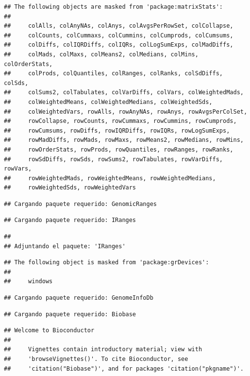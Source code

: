 \documentclass[
]{article}
\begin{document}
\begin{verbatim}
## The following objects are masked from 'package:matrixStats':
## 
##     colAlls, colAnyNAs, colAnys, colAvgsPerRowSet, colCollapse,
##     colCounts, colCummaxs, colCummins, colCumprods, colCumsums,
##     colDiffs, colIQRDiffs, colIQRs, colLogSumExps, colMadDiffs,
##     colMads, colMaxs, colMeans2, colMedians, colMins, colOrderStats,
##     colProds, colQuantiles, colRanges, colRanks, colSdDiffs, colSds,
##     colSums2, colTabulates, colVarDiffs, colVars, colWeightedMads,
##     colWeightedMeans, colWeightedMedians, colWeightedSds,
##     colWeightedVars, rowAlls, rowAnyNAs, rowAnys, rowAvgsPerColSet,
##     rowCollapse, rowCounts, rowCummaxs, rowCummins, rowCumprods,
##     rowCumsums, rowDiffs, rowIQRDiffs, rowIQRs, rowLogSumExps,
##     rowMadDiffs, rowMads, rowMaxs, rowMeans2, rowMedians, rowMins,
##     rowOrderStats, rowProds, rowQuantiles, rowRanges, rowRanks,
##     rowSdDiffs, rowSds, rowSums2, rowTabulates, rowVarDiffs, rowVars,
##     rowWeightedMads, rowWeightedMeans, rowWeightedMedians,
##     rowWeightedSds, rowWeightedVars
\end{verbatim}

\begin{verbatim}
## Cargando paquete requerido: GenomicRanges
\end{verbatim}

\begin{verbatim}
## Cargando paquete requerido: IRanges
\end{verbatim}

\begin{verbatim}
## 
## Adjuntando el paquete: 'IRanges'
\end{verbatim}

\begin{verbatim}
## The following object is masked from 'package:grDevices':
## 
##     windows
\end{verbatim}

\begin{verbatim}
## Cargando paquete requerido: GenomeInfoDb
\end{verbatim}

\begin{verbatim}
## Cargando paquete requerido: Biobase
\end{verbatim}

\begin{verbatim}
## Welcome to Bioconductor
## 
##     Vignettes contain introductory material; view with
##     'browseVignettes()'. To cite Bioconductor, see
##     'citation("Biobase")', and for packages 'citation("pkgname")'.
\end{verbatim}
\end{document}
